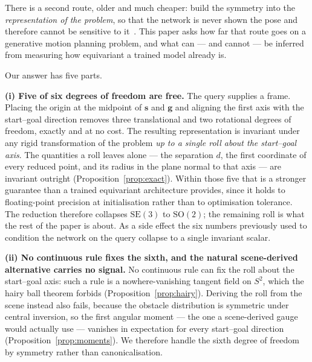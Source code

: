 \documentclass[10pt,twocolumn,letterpaper]{article}
\theoremstyle{plain}
\newcommand{\svec}{\mathbf{s}}
\newcommand{\gvec}{\mathbf{g}}
\newcommand{\SE}{\mathrm{SE}(3)}
\begin{document}
There is a second route, older and much cheaper: build the symmetry into the
\emph{representation of the problem}, so that the network is never shown the pose
and therefore cannot be sensitive to it~\cite{puny2022fa,kaba2023canon}. This
paper asks how far that route goes on a generative motion planning problem, and
what can --- and cannot --- be inferred from measuring how equivariant a trained
model already is.

Our answer has five parts.

\textbf{(i) Five of six degrees of freedom are free.} The query supplies a frame.
Placing the origin at the midpoint of $\svec$ and $\gvec$ and aligning the first
axis with the start--goal direction removes three translational and two rotational
degrees of freedom, exactly and at no cost. The resulting representation is
invariant under any rigid transformation of the problem \emph{up to a single
roll about the start--goal axis}. The quantities a roll leaves alone --- the
separation $d$, the first coordinate of every reduced point, and its radius in
the plane normal to that axis --- are invariant outright
(Proposition~\ref{prop:exact}). Within those five that
is a stronger guarantee than a trained equivariant architecture provides, since
it holds to floating-point precision at initialisation rather than to
optimisation tolerance. The reduction therefore collapses $\SE$ to
$\mathrm{SO}(2)$; the remaining roll is what the rest of the paper is about. As
a side effect the six numbers previously used to condition the network on the
query collapse to a single invariant scalar.

\textbf{(ii) No continuous rule fixes the sixth, and the natural scene-derived
alternative carries no signal.} No
continuous rule can fix the roll about the start--goal axis: such a rule is a
nowhere-vanishing tangent field on $S^2$, which the hairy ball theorem forbids
(Proposition~\ref{prop:hairy}). Deriving the roll from the scene instead also
fails, because the obstacle distribution is symmetric under central inversion, so
the first angular moment --- the one a scene-derived gauge would actually use ---
vanishes in expectation for every start--goal direction
(Proposition~\ref{prop:moments}). We therefore handle the sixth degree of freedom
by symmetry rather than canonicalisation.
\end{document}
